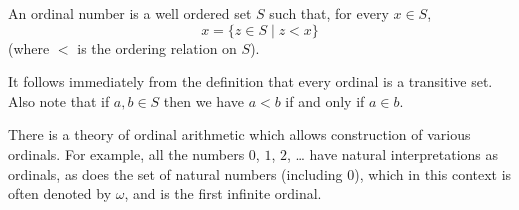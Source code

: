 \documentclass[12pt]{article}
\begin{document}
An ordinal number is a well ordered set $S$ such that, for every $x \in S$,
$$
x = \{z \in S \mid z < x\}
$$
(where $<$ is the ordering relation on $S$).

It follows immediately from the definition that every ordinal is a transitive set.
Also note that if $a,b\in S$ then we have $a<b$ if and only if $a\in b$.

There is a theory of ordinal arithmetic which allows construction of various ordinals.
For example, all the numbers $0$, $1$, $2$, \ldots
have natural interpretations as ordinals,
as does the set of natural numbers (including $0$),
which in this context is often denoted by $\omega$,
and is the first infinite ordinal.
\end{document}
